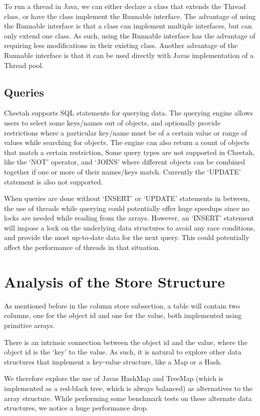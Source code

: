 \documentclass[11pt,journal,compsoc]{IEEEtran}
\begin{document}
To run a thread in Java, we can either declare a class that extends the Thread class, or have the class implement the Runnable interface. The advantage of using the Runnable interface is that a class can implement multiple interfaces, but can only extend one class. As such, using the Runnable interface has the advantage of requiring less modifications in their existing class. Another advantage of the Runnable interface is that it can be used directly with Java\textquotesingle s implementation of a Thread pool. 

\subsection{Queries}

Cheetah supports SQL statements for querying data. The querying engine allows users to select some keys/names out of objects, and optionally provide  restrictions where a particular key/name must be of a certain value or range of values while searching for objects. The engine can also return a count of objects that match a certain restriction, Some query types are not supported in Cheetah, like the ‘NOT’ operator, and ‘JOINS’ where different objects can be combined together if one or more of their names/keys match. Currently the ‘UPDATE’ statement is also not supported.


When queries are done without ‘INSERT’ or ‘UPDATE’ statements in between, the use of threads while querying could potentially offer huge speedups since no locks are needed while reading from the arrays. However, an ‘INSERT’ statement will impose a lock on the underlying data structures to avoid any race conditions, and provide the most up-to-date data for the next query. This could potentially affect the performance of threads in that situation.


\section{Analysis of the Store Structure}
As mentioned before in the column store subsection, a table will contain two columns, one for the object id and one for the value, both implemented using primitive arrays.

There is an intrinsic connection between the object id and the value, where the object id is the ‘key’ to the value. As such, it is natural to explore other data structures that implement a key-value structure, like a Map or a Hash.

We therefore explore the use of Java\textquotesingle s HashMap and TreeMap (which is implemented as a red-black tree, which is always balanced) as alternatives to the array structure. While performing some benchmark tests on these alternate data structures, we notice a huge performance drop.
\end{document}
